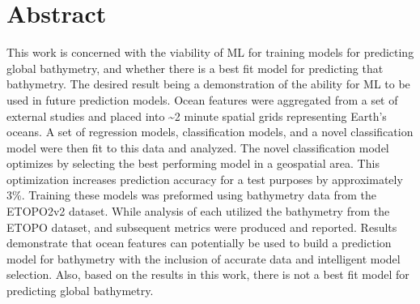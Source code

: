 \section{Abstract}
\setlength{\parindent}{10ex}
This work is concerned with the viability of \ac{ML} for training models  for predicting global bathymetry, and whether there is a best fit model for predicting that bathymetry.
The desired result being a demonstration of the ability for \ac{ML} to be used in future prediction models.
Ocean features were aggregated from a set of external studies and placed into \~{}2 minute spatial grids representing Earth's oceans.
A set of regression models, classification models, and a novel classification model were then fit to this data and analyzed.
The novel classification model optimizes by selecting the best performing model in a geospatial area.
This optimization increases prediction accuracy for a test purposes by approximately 3\%.
Training these models was preformed using bathymetry data from the ETOPO2v2 dataset.
While analysis of each utilized the bathymetry from the ETOPO dataset, and subsequent metrics were produced and reported.
Results demonstrate that ocean features can potentially be used to build a prediction model for bathymetry with the inclusion of accurate data and intelligent model selection.
Also, based on the results in this work, there is not a best fit model for predicting global bathymetry.
